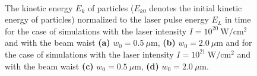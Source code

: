 \begin{figure}[h!]
	\centering
	\\
	\caption{The kinetic energy $ E_k $ of particles ($ E_{k0} $ denotes the initial kinetic energy of particles) normalized to the laser pulse energy $ E_L $ in time for the case of simulations with the laser intensity $ I = 10^{20} \ \mathrm{W/cm^2} $ and with the beam waist \textbf{(a)} $ w_0 = 0.5 \ \mu\mathrm{m} $, \textbf{(b)} $ w_0 = 2.0 \ \mu\mathrm{m} $ and for the case of simulations with the laser intensity $ I = 10^{21} \ \mathrm{W/cm^2} $ and with the beam waist \textbf{(c)} $ w_0 = 0.5 \ \mu\mathrm{m} $, \textbf{(d)} $ w_0 = 2.0 \ \mu\mathrm{m} $.}
	\label{fig:10}
\end{figure}

